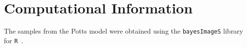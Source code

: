 \documentclass[journal]{IEEEtran}
\begin{document}
\appendix

\section{Computational Information}

The samples from the Potts model were obtained using the \verb|bayesImageS| library~\cite{ScalableBayesianInferencefortheInverseTemperatureofaHiddenPottsModel2018} for \verb|R|~\cite{R}.



\end{document}
